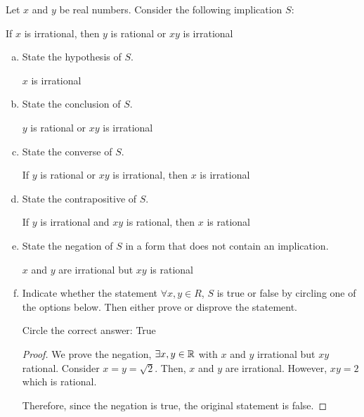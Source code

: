 \documentclass{agony}
\begin{document}
\question Let $x$ and $y$ be real numbers. Consider the following implication $S$:
\begin{center}
  If $x$ is irrational, then $y$ is rational or $xy$ is irrational
\end{center}
\begin{enumerate}[(a)]
  \item State the hypothesis of $S$. \begin{center}
          $x$ is irrational
        \end{center}
  \item State the conclusion of $S$. \begin{center}
          $y$ is rational or $xy$ is irrational
        \end{center}
  \item State the converse of $S$. \begin{center}
          If $y$ is rational or $xy$ is irrational, then $x$ is irrational
        \end{center}
  \item State the contrapositive of $S$. \begin{center}
          If $y$ is irrational and $xy$ is rational, then $x$ is rational
        \end{center}
  \item State the negation of $S$ in a form that does not contain an implication. \begin{center}
          $x$ and $y$ are irrational but $xy$ is rational
        \end{center}
  \item Indicate whether the statement $\forall x, y \in R$,
        $S$ is true or false by circling one of the options below.
        Then either prove or disprove the statement.

        Circle the correct answer: \quad True \quad {}
        \begin{proof}
          We prove the negation, $\exists x,y\in\mathbb{R}$ with $x$ and $y$ irrational but $xy$ rational.
          Consider $x = y = \sqrt2$. Then, $x$ and $y$ are irrational.
          However, $xy = 2$ which is rational.

          Therefore, since the negation is true, the original statement is false.
        \end{proof}
\end{enumerate}
\end{document}
